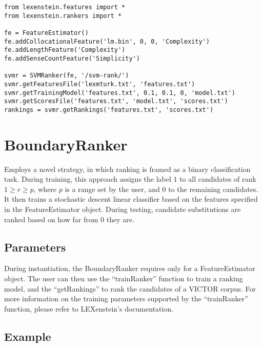 \begin{lstlisting}
from lexenstein.features import *
from lexenstein.rankers import *

fe = FeatureEstimator()
fe.addCollocationalFeature('lm.bin', 0, 0, 'Complexity')
fe.addLengthFeature('Complexity')
fe.addSenseCountFeature('Simplicity')

svmr = SVMRanker(fe, '/svm-rank/')
svmr.getFeaturesFile('lexmturk.txt', 'features.txt')
svmr.getTrainingModel('features.txt', 0.1, 0.1, 0, 'model.txt')
svmr.getScoresFile('features.txt', 'model.txt', 'scores.txt')
rankings = svmr.getRankings('features.txt', 'scores.txt')
\end{lstlisting}



















\section{BoundaryRanker}

Employs a novel strategy, in which ranking is framed as a binary classification task. During training, this approach assigns the label $1$ to all candidates of rank $1\geq r \geq p$, where $p$ is a range set by the user, and $0$ to the remaining candidates. It then trains a stochastic descent linear classifier based on the features specified in the FeatureEstimator object. During testing, candidate substitutions are ranked based on how far from $0$ they are.

\subsection{Parameters}

During instantiation, the BoundaryRanker requires only for a FeatureEstimator object. The user can then use the ``trainRanker'' function to train a ranking model, and the ``getRankings'' to rank the candidates of a VICTOR corpus. For more information on the training parameters supported by the ``trainRanker'' function, please refer to LEXenstein's documentation.

\subsection{Example}

